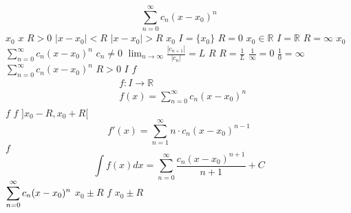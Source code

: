 \documentclass{article}
\begin{document}
$$
 \sum_{n=0}^{\infty}{c_n(x-x_0)^n}
$$
$x_0$
$x$
$R > 0$
$|x-x_0|<R$
$|x-x_0|>R$
$x_0$
$I = \{x_0\}$
$R=0$
$x_0 \in \mathbb{R}$
$I = \mathbb{R}$
$R=\infty$
$x_0$
$\displaystyle\sum_{n=0}^{\infty}{c_n(x-x_0)^n}$
$\displaystyle c_n \neq 0$
$\displaystyle \lim_{n\to\infty} \frac{|c_{n+1}|}{|c_n|} = L$
$R$
$\displaystyle R=\frac{1}{L}$
$\displaystyle \frac{1}{\infty} = 0$
$\displaystyle \frac{1}{0} = \infty$
$\displaystyle \sum_{n=0}^{\infty}{c_n(x-x_0)^n}$
$R > 0$
$I$
$f$
$$
\begin{aligned}
    &f: I \to \mathbb{R}\\
    &f(x) = \sum_{n=0}^{\infty}{c_n(x-x_0)^n}
\end{aligned}
$$
$f$
$f$
$]x_0 - R, x_0 + R[$
$$
f'(x) = \sum_{n=1}^{\infty}{n \cdot c_n(x-x_0)^{n-1}}
$$
$f$
$$
\int{f(x)}dx = \sum_{n=0}^{\infty}{\frac{c_n(x-x_0)^{n+1}}{n+1}} + C
$$
$\displaystyle \displaystyle \sum_{n=0}^{\infty}{c_n(x-x_0)^n}$
$x_0 \pm R$
$f$
$x_0 \pm R$
\end{document}

